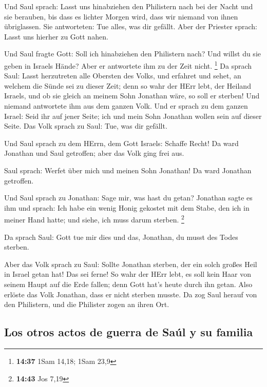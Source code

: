  Und Saul sprach: Lasst uns hinabziehen den Philistern
nach bei der Nacht und sie berauben, bis dass es lichter Morgen wird,
dass wir niemand von ihnen übriglassen. Sie antworteten: Tue alles, was
dir gefällt. Aber der Priester sprach: Lasst uns hierher zu Gott nahen.

 Und Saul fragte Gott: Soll ich hinabziehen den
Philistern nach? Und willst du sie geben in Israels Hände? Aber er
antwortete ihm zu der Zeit nicht. \footnote{\textbf{14:37} 1Sam 14,18;
  1Sam 23,9}  Da sprach Saul: Lasst herzutreten alle
Obersten des Volks, und erfahret und sehet, an welchem die Sünde sei zu
dieser Zeit;  denn so wahr der HErr lebt, der Heiland
Israels, und ob sie gleich an meinem Sohn Jonathan wäre, so soll er
sterben! Und niemand antwortete ihm aus dem ganzen Volk. 
Und er sprach zu dem ganzen Israel: Seid ihr auf jener Seite; ich und
mein Sohn Jonathan wollen sein auf dieser Seite. Das Volk sprach zu
Saul: Tue, was dir gefällt.

 Und Saul sprach zu dem HErrn, dem Gott Israels: Schaffe
Recht! Da ward Jonathan und Saul getroffen; aber das Volk ging frei aus.

 Saul sprach: Werfet über mich und meinen Sohn Jonathan!
Da ward Jonathan getroffen.

 Und Saul sprach zu Jonathan: Sage mir, was hast du
getan? Jonathan sagte es ihm und sprach: Ich habe ein wenig Honig
gekostet mit dem Stabe, den ich in meiner Hand hatte; und siehe, ich
muss darum sterben. \footnote{\textbf{14:43} Jos 7,19}

 Da sprach Saul: Gott tue mir dies und das, Jonathan, du
musst des Todes sterben.

 Aber das Volk sprach zu Saul: Sollte Jonathan sterben,
der ein solch großes Heil in Israel getan hat! Das sei ferne! So wahr
der HErr lebt, es soll kein Haar von seinem Haupt auf die Erde fallen;
denn Gott hat's heute durch ihn getan. Also erlöste das Volk Jonathan,
dass er nicht sterben musste.  Da zog Saul herauf von den
Philistern, und die Philister zogen an ihren Ort.

\hypertarget{los-otros-actos-de-guerra-de-sauxfal-y-su-familia}{%
\subsection{Los otros actos de guerra de Saúl y su
familia}\label{los-otros-actos-de-guerra-de-sauxfal-y-su-familia}}

